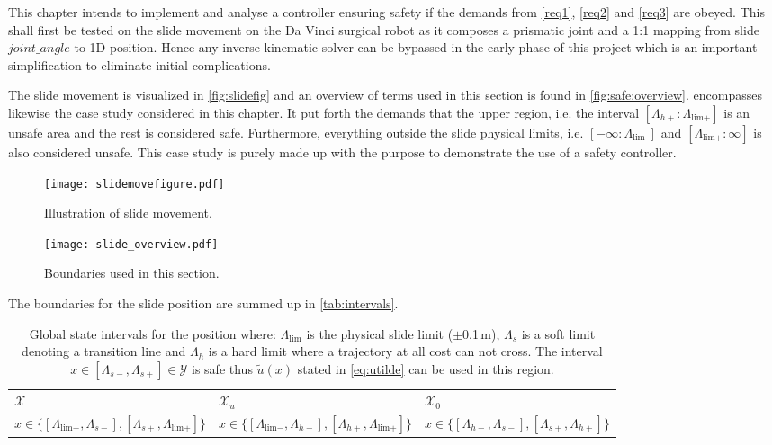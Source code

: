 This chapter intends to implement and analyse a controller ensuring safety if the demands from \autoref{req1}, \ref{req2} and \ref{req3} are obeyed. This shall first be tested on the slide movement on the Da Vinci surgical robot as it composes a prismatic joint and a 1:1 mapping from slide $joint\_angle$ to 1D position. Hence any inverse kinematic solver can be bypassed in the early phase of this project which is an important simplification to eliminate initial complications.

The slide movement is visualized in \autoref{fig:slidefig} and an overview of terms used in this section is found in \autoref{fig:safe:overview}.  encompasses likewise the case study considered in this chapter. It put forth the demands that the upper region, i.e. the interval $[\Lambda_{h+}:\Lambda_\text{lim+}]$ is an unsafe area and the rest is considered safe. Furthermore, everything outside the slide physical limits, i.e. $[-\infty:\Lambda_\text{lim-}]$ and $[\Lambda_\text{lim+}:\infty]$ is also considered unsafe. This case study is purely made up with the purpose to demonstrate the use of a safety controller.
\begin{figure}[H]
    \centering
    \begin{minipage}{.5\textwidth}
        \centering
        \texttt{[image: slidemovefigure.pdf]}
        \caption{Illustration of slide movement.}
        \label{fig:slidefig}
    \end{minipage}%
    \begin{minipage}{0.5\textwidth}
        \centering
        \texttt{[image: slide\_overview.pdf]}
        \caption{Boundaries used in this section.}
        \label{fig:safe:overview}
    \end{minipage}
\end{figure}
The boundaries for the slide position are summed up in \autoref{tab:intervals}.
\begin{table}[H]
	\begin{tabularx}{\textwidth}{X X X }
\rowcolor{HeaderBlue} 
$\mathcal{X}$ & $\mathcal{X}_u$  & $\mathcal{X}_0$ \\
$x \in \{[\Lambda_{\text{lim}-},\Lambda_{s-}],[\Lambda_{s+},\Lambda_{\text{lim}+}]\}$  & $x \in \{[\Lambda_{\text{lim}-},\Lambda_{h-}],[\Lambda_{h+},\Lambda_{\text{lim}+}]\} $ & $x \in \{[\Lambda_{h-},\Lambda_{s-}],[\Lambda_{s+},\Lambda_{h+}]\}$  \\
\end{tabularx}
\caption{Global state intervals for the position where: $\Lambda_\text{lim}$ is the physical slide limit ($\pm$0.1\,m), $\Lambda_s$ is a soft limit denoting a transition line and $\Lambda_h$ is a hard limit where a trajectory at all cost can not cross. The interval $x \in [\Lambda_{s-},\Lambda_{s+}] \in \mathcal{Y}$ is safe thus $\tilde{u}(x)$ stated in \autoref{eq:utilde} can be used in this region.}
\label{tab:intervals}
\end{table}
